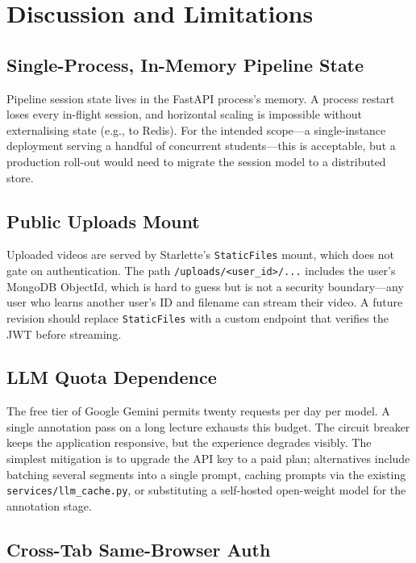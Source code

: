 \documentclass[conference]{IEEEtran}
\begin{document}
\section{Discussion and Limitations}\label{sec:discussion}

\subsection{Single-Process, In-Memory Pipeline State}

Pipeline session state lives in the FastAPI process's memory. A process restart loses every in-flight session, and horizontal scaling is impossible without externalising state (e.g., to Redis). For the intended scope---a single-instance deployment serving a handful of concurrent students---this is acceptable, but a production roll-out would need to migrate the session model to a distributed store.

\subsection{Public Uploads Mount}

Uploaded videos are served by Starlette's \texttt{StaticFiles} mount, which does not gate on authentication. The path \texttt{/uploads/<user\_id>/...} includes the user's MongoDB ObjectId, which is hard to guess but is not a security boundary---any user who learns another user's ID and filename can stream their video. A future revision should replace \texttt{StaticFiles} with a custom endpoint that verifies the JWT before streaming.

\subsection{LLM Quota Dependence}

The free tier of Google Gemini permits twenty requests per day per model. A single annotation pass on a long lecture exhausts this budget. The circuit breaker keeps the application responsive, but the experience degrades visibly. The simplest mitigation is to upgrade the API key to a paid plan; alternatives include batching several segments into a single prompt, caching prompts via the existing \texttt{services/llm\_cache.py}, or substituting a self-hosted open-weight model for the annotation stage.

\subsection{Cross-Tab Same-Browser Auth}
\end{document}
